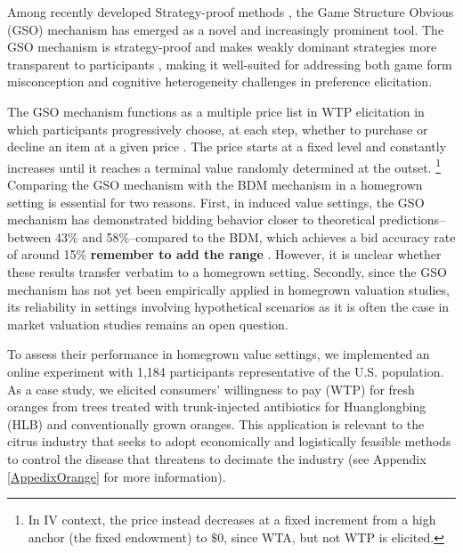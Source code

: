 \documentclass[12pt]{article}
\begin{document}
Among recently developed Strategy-proof methods \citep{li_obviously_2017, pycia_theory_2023}, the Game Structure Obvious (GSO) mechanism has emerged as a novel and increasingly prominent tool. The GSO mechanism is strategy-proof and makes weakly dominant strategies more transparent to participants \citep{chakraborty_future_2025}, making it well-suited for addressing both game form misconception and cognitive heterogeneity challenges in preference elicitation. 

The GSO mechanism functions as a multiple price list in WTP elicitation in which participants progressively choose, at each step, whether to purchase or decline an item at a given price \citep{yu2021multiple, herberich2012digging, jack2022multiple}. The price starts at a fixed level and constantly increases until it reaches a terminal value randomly determined at the outset. \footnote{In IV context, the price instead decreases at a fixed increment from a high anchor (the fixed endowment) to $\$0$,  since WTA, but not WTP is elicited.} Comparing the GSO mechanism with the BDM mechanism in a homegrown setting is essential for two reasons. First, in induced value settings, the GSO mechanism has demonstrated  bidding behavior closer to theoretical predictions--between 43\% and 58\%--compared to the BDM, which achieves a bid accuracy rate of around 15\% \textbf{remember to add the range} \citep{chakraborty_future_2025}. However, it is unclear whether these results transfer verbatim to a homegrown setting. Secondly, since the GSO mechanism has not yet been empirically applied in homegrown valuation studies, its reliability in settings involving hypothetical scenarios as it is often the case in market valuation studies remains an open question.

To assess their performance in homegrown value settings, we implemented an online experiment with 1,184 participants representative of the U.S. population. As a case study, we elicited consumers' willingness to pay (WTP) for fresh oranges from trees treated with trunk-injected antibiotics for Huanglongbing (HLB) and conventionally grown oranges. This application is relevant to the citrus industry that seeks to adopt economically and logistically feasible methods to control the disease that threatens to decimate the industry  (see Appendix \ref{AppedixOrange} for more information). 
\end{document}
